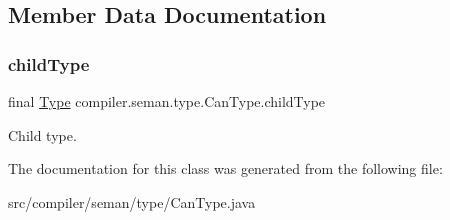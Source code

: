 \subsection{Member Data Documentation}
\mbox{\label{classcompiler_1_1seman_1_1type_1_1_can_type_a1db6e3a806fd5de1c78458f80d921aee}} 
\subsubsection{\texorpdfstring{child\+Type}{childType}}
{\footnotesize\ttfamily final \hyperlink{classcompiler_1_1seman_1_1type_1_1_type}{Type} compiler.\+seman.\+type.\+Can\+Type.\+child\+Type}

Child type. 

The documentation for this class was generated from the following file\+:\begin{DoxyCompactItemize}
\item 
src/compiler/seman/type/Can\+Type.\+java\end{DoxyCompactItemize}

